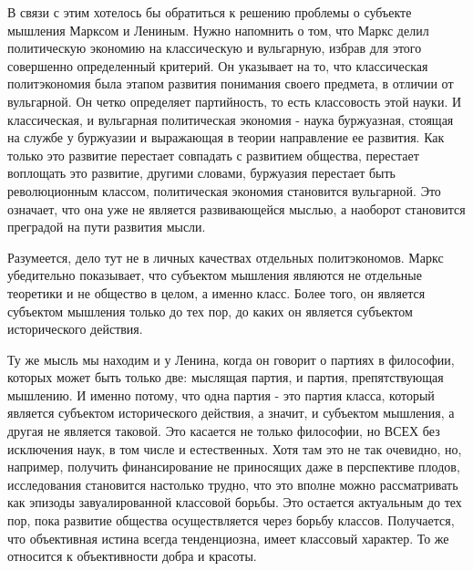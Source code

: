 \documentclass[12pt,a4paper,openany]{book}
\begin{document}
В связи с этим хотелось бы обратиться к решению проблемы о субъекте мышления Марксом и Лениным. Нужно напомнить о том, что Маркс делил политическую экономию на классическую и вульгарную, избрав для этого совершенно определенный критерий. Он указывает на то, что классическая политэкономия была этапом развития понимания своего предмета, в отличии от вульгарной. Он четко определяет партийность, то есть классовость этой науки. И классическая, и вульгарная политическая экономия - наука буржуазная, стоящая на службе у буржуазии и выражающая в теории направление ее развития. Как только это развитие перестает совпадать с развитием общества, перестает воплощать это развитие, другими словами, буржуазия перестает быть революционным классом, политическая экономия становится вульгарной. Это означает, что она уже не является развивающейся мыслью, а наоборот становится преградой на пути развития мысли.

Разумеется, дело тут не в личных качествах отдельных политэкономов. Маркс убедительно показывает, что субъектом мышления являются не отдельные теоретики и не общество в целом, а именно класс. Более того, он является субъектом мышления только до тех пор, до каких он является субъектом исторического действия.

Ту же мысль мы находим и у Ленина, когда он говорит о партиях в философии, которых может быть только две: мыслящая партия, и партия, препятствующая мышлению. И именно потому, что одна партия - это партия класса, который является субъектом исторического действия, а значит, и субъектом мышления, а другая не является таковой. Это касается не только философии, но ВСЕХ без исключения наук, в том числе и естественных. Хотя там это не так очевидно, но, например, получить финансирование не приносящих даже в перспективе плодов, исследования становится настолько трудно, что это вполне можно рассматривать как эпизоды завуалированной классовой борьбы. Это остается актуальным до тех пор, пока развитие общества осуществляется через борьбу классов. Получается, что объективная истина всегда тенденциозна, имеет классовый характер. То же относится к объективности добра и красоты.
\end{document}
